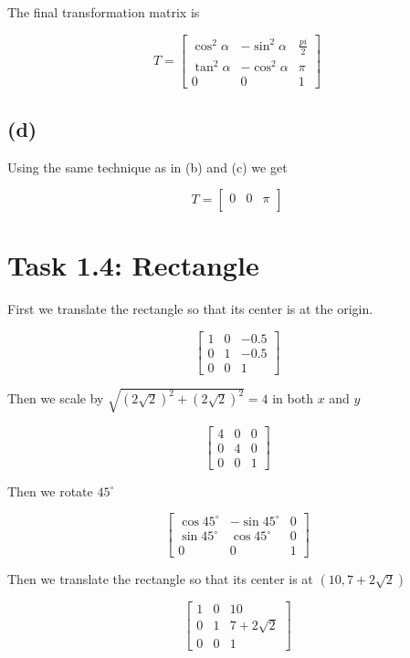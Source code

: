 \documentclass[paper=a4, fontsize=11pt]{scrartcl} %
\numberwithin{equation}{section} %
\numberwithin{figure}{section} %
\numberwithin{table}{section} %
\begin{document}
The final transformation matrix is

\[
  T = 
  \begin{bmatrix}
  \cos^2\alpha & -\sin^2\alpha & \frac{pi}{2}\\
  \tan^2\alpha & -\cos^2\alpha &  \pi\\
    0 & 0 & 1
  \end{bmatrix}
\]

\subsection*{(d)}

Using the same technique as in (b) and (c) we get

\[
  T =
  \begin{bmatrix}
    0 & 0 & \pi \\

  \end{bmatrix}
\]

\section*{Task 1.4: Rectangle}

First we translate the rectangle so that its center is at the origin.

\[
  \begin{bmatrix}
    1 & 0 & -0.5\\
    0 & 1 & -0.5\\
    0 & 0 & 1
  \end{bmatrix}
\]

Then we scale by $\sqrt{(2\sqrt2)^2 + (2\sqrt2)^2} = 4$ in both $x$ and $y$

\[
  \begin{bmatrix}
    4 & 0 & 0\\
    0 & 4 & 0\\
    0 & 0 & 1
  \end{bmatrix}
\]

Then we rotate $45^\circ$

\[
  \begin{bmatrix}
    \cos{45^\circ} & -\sin{45^\circ} & 0\\
    \sin{45^\circ} & \cos{45^\circ} & 0\\
    0 & 0 & 1
  \end{bmatrix}
\]

Then we translate the rectangle so that its center is at $(10, 7+2\sqrt{2})$

\[
  \begin{bmatrix}
    1 & 0 & 10\\
    0 & 1 & 7 + 2\sqrt{2}\\
    0 & 0 & 1
  \end{bmatrix}
\]
\end{document}
